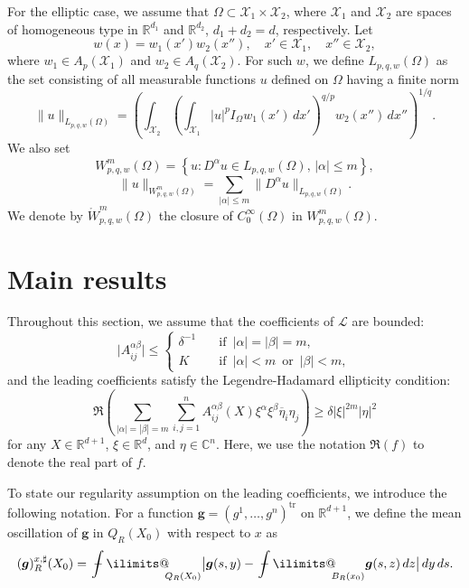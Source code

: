 \documentclass[reqno]{amsart}
\numberwithin{equation}{section}
\theoremstyle{plain}
\theoremstyle{definition}
\theoremstyle{remark}
\begin{document}
For the elliptic case, we assume that $\Omega\subset {\mathcal{X}}_1\times {\mathcal{X}}_2$, where ${\mathcal{X}}_1$ and ${\mathcal{X}}_2$ are spaces of homogeneous type in ${\mathbb{R}}^{d_1}$ and ${\mathbb{R}}^{d_2}$, $d_1+d_2=d$, respectively.
Let 
\[
w(x)=w_1(x')w_2(x''), \quad x'\in {\mathcal{X}}_1, \quad x''\in {\mathcal{X}}_2,
\]
where $w_1\in A_p({\mathcal{X}}_1)$ and $w_2\in A_q( {\mathcal{X}}_2)$.
For such $w$, we define $L_{p,q,w}( \Omega)$ as the set consisting of all measurable functions $u$ defined on $\Omega$ having a finite norm
$$
\|u\|_{L_{p,q,w}(\Omega)}=\left(\int_{ {\mathcal{X}}_2}\left(\int_{{\mathcal{X}}_1} |u|^pI_\Omega w_1(x')\,dx'\right)^{q/p}w_2(x'')\,dx''\right)^{1/q}.
$$
We also set 
$$
W^m_{p,q,w}(\Omega)=\left\{u: D^\alpha u\in L_{p,q,w}(\Omega), \, |\alpha|\le m\right\},
$$
$$
\|u\|_{W^m_{p,q,w}(\Omega)}=\sum_{|\alpha|\le m}\| D^\alpha u\|_{L_{p,q,w}(\Omega)}.
$$
We denote by $\mathring{W}^m_{p,q,w}(\Omega)$ the closure of $C_0^\infty(\Omega)$ in $W^m_{p,q,w}(\Omega)$.

\section{Main results}		\label{sec3}

Throughout this section, we assume that the coefficients of ${\mathcal{L}}$ are bounded:
\begin{equation}		\label{boundedness}
\big|A^{\alpha\beta}_{ij}\big| \le 
\left\{
\begin{aligned}
\delta^{-1}&\quad \text{if }\, |\alpha|=|\beta|=m,\\
K &\quad \text{if }\, |\alpha|<m \,\text{ or } \, |\beta|<m,
\end{aligned}
\right.
\end{equation}
and the leading coefficients satisfy the  Legendre-Hadamard ellipticity condition:
\begin{equation}		\label{LH}
\Re \left(\sum_{|\alpha|=|\beta|=m} \sum_{i,j=1}^n A^{\alpha\beta}_{ij}(X)\xi^\alpha \xi^\beta \overline{\eta}_i\eta_j \right) \ge \delta|\xi|^{2m}|\eta|^2  
\end{equation}
for any $X\in {\mathbb{R}}^{d+1}$, $\xi\in {\mathbb{R}}^d$, and $\eta\in {\mathbb{C}}^n$.
Here, we use the notation $\Re(f)$ to denote the real part of $f$.

To state our regularity assumption on the leading coefficients, we introduce the following notation. 
For a function ${\boldsymbol{g}}=( g^1,\ldots, g^n)^{\operatorname{tr}}$ on ${\mathbb{R}}^{d+1}$, 
we define the mean oscillation of ${\boldsymbol{g}}$ in $Q_R(X_0)$ with respect to $x$ as
\begin{equation*}		
({\boldsymbol{g}})^{x,\sharp}_R(X_0)={\operatorname{\,\,\text{\bf--}\kern-.98em\DOTSI\intop\ilimits@\!\!}}_{Q_R(X_0)}\big|{\boldsymbol{g}}(s,y)-{\operatorname{\,\,\text{\bf--}\kern-.98em\DOTSI\intop\ilimits@\!\!}}_{B_R(x_0)}{\boldsymbol{g}}(s,z) \, dz  \big| \,dy \, ds.
\end{equation*}
\end{document}
